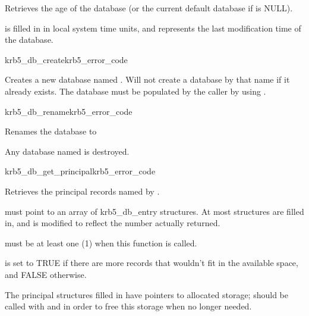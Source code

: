 Retrieves the age of the database  (or the current
default database if  is NULL).

 is filled in in local system time units, and represents
the last modification time of the database.



\begin{funcdecl}{krb5_db_create}{krb5_error_code}{\funcin}
\end{funcdecl}

Creates a new database named .  Will not create a
database by that name if it already exists.  The database must be
populated by the caller by using .


\begin{funcdecl}{krb5_db_rename}{krb5_error_code}{\funcin}
\end{funcdecl}
Renames the database  to 

Any database named  is destroyed.


\begin{funcdecl}{krb5_db_get_principal}{krb5_error_code}{\funcin}
\funcout
{}
\funcinout
{}
\funcout
{}
\end{funcdecl}

Retrieves the principal records named by .

 must point to an array of 
krb5_db_entry structures.
At most  structures are filled in, and
 is modified to reflect the number actually returned.

 must be at least one (1) when this function is called.

 is set to TRUE if there are more records that wouldn't fit
in the available space, and FALSE otherwise.

The principal structures filled in have pointers to allocated storage;
 should be called with
 and 
in order to free this storage when no longer needed.


